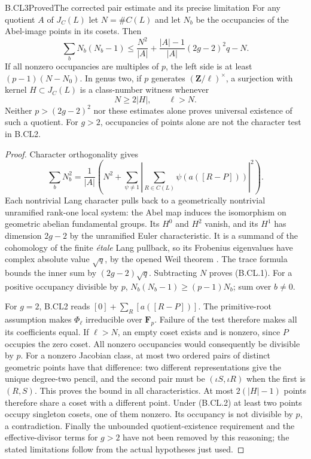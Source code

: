 \begin{claim}{B.CL3}{Proved}{The corrected pair estimate and its precise limitation}
For any quotient $A$ of $J_C(L)$ let $N=\#C(L)$ and let
$N_b$ be the occupancies of the Abel-image points in its cosets.
Then
\[
 \sum_bN_b(N_b-1)
 \le \frac{N^2}{|A|}
       +\frac{|A|-1}{|A|}(2g-2)^2q-N.                    \tag{B.CL.1}
\]
If all nonzero occupancies are multiples of $p$, the left side
is at least $(p-1)(N-N_0)$. In genus two, if $p$ generates
$(\mathbf Z/\ell)^\times$, a surjection with kernel
$H\subset J_C(L)$ is a class-number witness whenever
\[
                       N\ge2|H|,\qquad \ell>N.         \tag{B.CL.2}
\]
Neither $p>(2g-2)^2$ nor these estimates alone proves universal
existence of such a quotient. For $g>2$, occupancies of points
alone are not the character test in B.CL2.
\end{claim}
\begin{proof}
Character orthogonality gives
\[
 \sum_bN_b^2=\frac{1}{|A|}
       \left(N^2+\sum_{\psi\ne1}
          \left|\sum_{R\in C(L)}\psi(a([R-P]))\right|^2\right).
\]
Each nontrivial Lang character pulls back to a geometrically
nontrivial unramified rank-one local system: the Abel map
induces the isomorphism on geometric abelian fundamental groups.
Its $H^0$ and $H^2$ vanish, and its $H^1$ has dimension
$2g-2$ by the unramified Euler characteristic. It is a summand
of the cohomology of the finite \emph{\'etale} Lang pullback,
so its Frobenius eigenvalues have complex absolute value
$\sqrt q$, by the opened Weil theorem
\citep[Theorem~1.6 and formula~1.5.1]{WeilCurves}.
The trace formula bounds the inner sum by $(2g-2)\sqrt q$.
Subtracting $N$ proves (B.CL.1). For a positive occupancy
divisible by $p$, $N_b(N_b-1)\ge(p-1)N_b$; sum over $b\ne0$.

For $g=2$, B.CL2 reads $[0]+\sum_R[a([R-P])]$.
The primitive-root assumption makes $\Phi_\ell$ irreducible
over $\mathbf F_p$. Failure of the test therefore makes all
its coefficients equal. If $\ell>N$, an empty coset exists
and is nonzero, since $P$ occupies the zero coset. All nonzero
occupancies would consequently be divisible by $p$.
For a nonzero Jacobian class, at most two ordered pairs of
distinct geometric points have that difference: two different
representations give the unique degree-two pencil, and the
second pair must be $(\iota S,\iota R)$ when the first is
$(R,S)$. This proves the bound in all characteristics.
At most $2(|H|-1)$ points therefore share a coset with a
different point. Under (B.CL.2) at least two points occupy
singleton cosets, one of them nonzero. Its occupancy is not
divisible by $p$, a contradiction. Finally the unbounded
quotient-existence requirement and the effective-divisor terms
for $g>2$ have not been removed by this reasoning; the stated
limitations follow from the actual hypotheses just used.
\end{proof}

